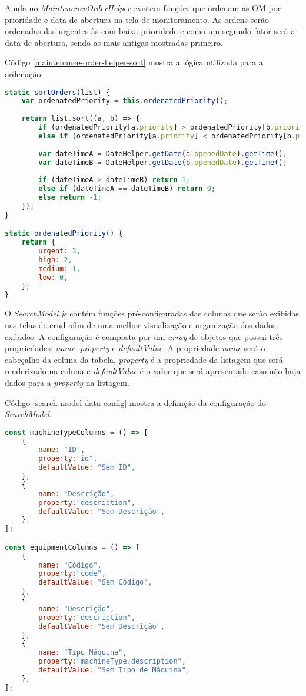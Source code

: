 Ainda no \textit{MaintenanceOrderHelper} existem funções que ordenam as OM por prioridade e data de abertura na tela de monitoramento.
As ordens serão ordenadas das urgentes às com baixa prioridade e como um segundo fator será a data de abertura, sendo as mais antigas mostradas primeiro.

Código \ref{maintenance-order-helper-sort} mostra a lógica utilizada para a ordenação.

\begin{lstlisting}[language=JavaScript, caption={Funções responsáveis pela ordenação}, label={maintenance-order-helper-sort}]
static sortOrders(list) {
	var ordenatedPriority = this.ordenatedPriority();
	
	return list.sort((a, b) => {
		if (ordenatedPriority[a.priority] > ordenatedPriority[b.priority]) return -1;
		else if (ordenatedPriority[a.priority] < ordenatedPriority[b.priority]) return 1;
		
		var dateTimeA = DateHelper.getDate(a.openedDate).getTime();
		var dateTimeB = DateHelper.getDate(b.openedDate).getTime();
		
		if (dateTimeA > dateTimeB) return 1;
		else if (dateTimeA == dateTimeB) return 0;
		else return -1;
	});
}

static ordenatedPriority() {
	return {
		urgent: 3,
		high: 2,
		medium: 1,
		low: 0,
	};
}
\end{lstlisting}

O \textit{SearchModel.js} contém funções pré-configuradas das colunas que serão exibidas nas telas de crud afim de uma melhor visualização e organização dos dados exibidos.
A configuração é composta por um \textit{array} de objetos que possui três propriedades: \textit{name}, \textit{property} e \textit{defaultValue}.
A propriedade \textit{name} será o cabeçalho da coluna da tabela, \textit{property} é a propriedade da listagem que será renderizado na coluna e \textit{defaultValue} é o valor que será apresentado caso não haja dados para a \textit{property} na listagem.

Código \ref{search-model-data-config} mostra a definição da configuração do \textit{SearchModel}.

\begin{lstlisting}[language=JavaScript, caption={Definição da configuração para consulta de dados}, label={search-model-data-config}]
const machineTypeColumns = () => [
	{
		name: "ID",
		property:"id",
		defaultValue: "Sem ID",
	},
	{
		name: "Descrição",
		property:"description",
		defaultValue: "Sem Descrição",
	},
];

const equipmentColumns = () => [
	{
		name: "Código",
		property:"code",
		defaultValue: "Sem Código",
	},
	{
		name: "Descrição",
		property:"description",
		defaultValue: "Sem Descrição",
	},
	{
		name: "Tipo Máquina",
		property:"machineType.description",
		defaultValue: "Sem Tipo de Máquina",
	},
];
\end{lstlisting}

